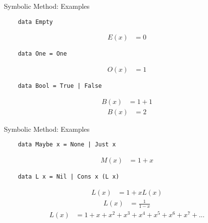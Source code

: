 \documentclass[pdf]{beamer}
\begin{document}
\begin{frame}[fragile]{Symbolic Method: Examples}
  \begin{verbatim}
    data Empty
  \end{verbatim}
  \pause
  \begin{align*}
    E(x) &= 0
  \end{align*}

  \pause
  \begin{verbatim}
    data One = One
  \end{verbatim}
  \pause
  \begin{align*}
    O(x) &= 1
  \end{align*}

  \pause
  \begin{verbatim}
    data Bool = True | False
  \end{verbatim}
  \pause
  \begin{align*}
    B(x) &= 1 + 1
  \end{align*}
  \pause
  \begin{align*}
    B(x) &= 2
  \end{align*}
\end{frame}

\begin{frame}[fragile]{Symbolic Method: Examples}
  \begin{verbatim}
    data Maybe x = None | Just x
  \end{verbatim}
  \pause
  \begin{align*}
    M(x) &= 1 + x
  \end{align*}

  \pause
  \begin{verbatim}
    data L x = Nil | Cons x (L x)
  \end{verbatim}
  \pause
  \begin{align*}
    L(x) &= 1 + x L(x)
  \end{align*}
  \pause
  \begin{align*}
    L(x) &= \frac{1}{1-x}
  \end{align*}
  \pause
  \begin{align*}
    L(x) &= 1 + x + x^2 + x^3 + x^4 + x^5 + x^6 + x^7 +...
  \end{align*}
\end{frame}
\end{document}
